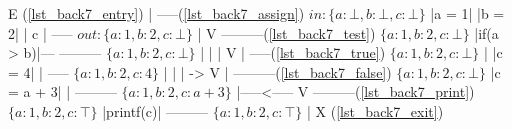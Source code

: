 \begin{minipage}[t]{3in}\label{lst_back7_entry}%
\label{lst_back7_assign}%
\label{lst_back7_test}%
\label{lst_back7_true}%
\label{lst_back7_false}%
\label{lst_back7_print}%
\label{lst_back7_exit}
\begin{AVerb}
     E (\ref{lst_back7_entry})
     |
   -----(\ref{lst_back7_assign}) $\mathit{in:} \{a : \bot,b : \bot,c : \bot\}$
  |a = 1|
  |b = 2|
  |  c  |
   -----    $\mathit{out:} \{a : 1,b : 2,c : \bot\}$
     |
     V
 ---------(\ref{lst_back7_test}) $\{a : 1,b : 2,c : \bot\}$
|if(a > b)|---
 ---------    $\{a : 1,b : 2,c : \bot\}$
     |        |
     |        V
     |      -----(\ref{lst_back7_true}) $\{a : 1,b : 2,c : \bot\}$
     |     |c = 4|
     |      -----    $\{a : 1,b : 2,c : 4\}$
     |        |
     |         ->
     V           |
 ---------(\ref{lst_back7_false}) $\{a : 1,b : 2,c : \bot\}$
|c = a + 3|      |
 ---------    $\{a : 1,b : 2,c : a + 3\}$
     |-----<-----
     V
 ---------(\ref{lst_back7_print}) $\{a : 1,b : 2,c : \top\}$
|printf(c)|
 ---------    $\{a : 1,b : 2,c : \top\}$
     |
     X (\ref{lst_back7_exit})
\end{AVerb}
\end{minipage}





